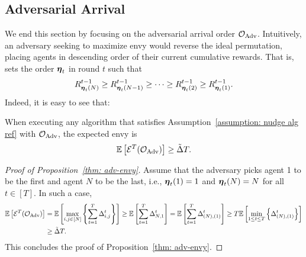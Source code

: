 \subsection{Adversarial Arrival}
\label{sec: advord}
We end this section by focusing on the adversarial arrival order $\mathcal O_{\textnormal{Adv}}$. Intuitively, an adversary seeking to maximize envy would reverse the ideal permutation, placing agents in descending order of their current cumulative rewards. That is, sets the order $\boldsymbol{\eta}_t$ in round $t$ such that
\[
R^{t-1}_{\boldsymbol{\eta}_t(N)} \geq R^{t-1}_{\boldsymbol{\eta}_t(N-1)} \geq \dots \geq R^{t-1}_{\boldsymbol{\eta}_t(2)} \geq R^{t-1}_{\boldsymbol{\eta}_t(1)}.
\]
Indeed, it is easy to see that:
\begin{proposition}\label{thm: adv-envy}
When executing any algorithm that satisfies Assumption~\ref{assumption: nudge alg ref} with $\mathcal O_{\textnormal{Adv}}$, the expected envy is
    \[\mathbb{E}\left[ \mathcal{E}^T ({\mathcal O_{\textnormal{Adv}}}) \right]\geq \tilde{\Delta}T.\]
\end{proposition}
\begin{proof}[Proof of Proposition~\ref{thm: adv-envy}]
Assume that the adversary picks agent 1 to be the first and agent $N$ to be the last, i.e., $\boldsymbol{\eta}_t(1)=1$ and $\boldsymbol{\eta}_t(N)=N$ for all $t\in [T]$. In such a case,
\begin{align*}
\mathbb{E}\left[ \mathcal{E}^T({\mathcal O_{\textnormal{Adv}}}) \right] &=
\mathbb{E}\left[ \max_{i,j\in [N]}{\left\{ \sum^T_{t=1}{\Delta^t_{i,j}} \right\} } \right] \geq \mathbb{E}\left[ \sum^T_{t=1}{\Delta_{N,1}^t} \right] = \mathbb{E}\left[ \sum^T_{t=1}{\Delta^t_{(N),(1)}} \right]  \geq T\mathbb{E}\left[ \min_{1 \leq t \leq T}{\left\{\Delta^t_{\left(N\right),\left(1\right)} \right\} } \right] \\
&\geq \tilde\Delta T.    
\end{align*}
This concludes the proof of Proposition~\ref{thm: adv-envy}.
\end{proof}


